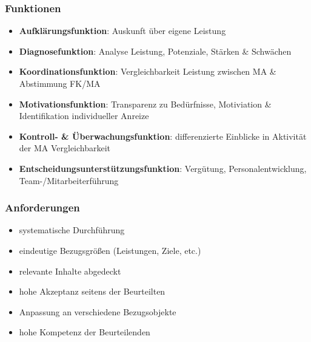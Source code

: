 \documentclass{cheatsheet}
\begin{document}
    \begin{normbox}{\subsubsection{Funktionen}}
        \begin{itemize}
            \item \textbf{Aufklärungsfunktion}: Auskunft über eigene Leistung
            \item \textbf{Diagnosefunktion}: Analyse Leistung, Potenziale, Stärken \& Schwächen
            \item \textbf{Koordinationsfunktion}: Vergleichbarkeit Leistung zwischen MA \& Abstimmung  FK/MA
            \item \textbf{Motivationsfunktion}: Transparenz zu Bedürfnisse, Motiviation \& Identifikation individueller Anreize
            \item \textbf{Kontroll- \& Überwachungsfunktion}: differenzierte Einblicke in Aktivität der MA \ra Vergleichbarkeit
            \item \textbf{Entscheidungsunterstützungsfunktion}: Vergütung, Personalentwicklung, Team-/Mitarbeiterführung
        \end{itemize}
    \end{normbox}
    \begin{normbox}{\subsubsection{Anforderungen}}
        \begin{itemize}
            \item systematische Durchführung
            \item eindeutige Bezugsgrößen (Leistungen, Ziele, etc.)
            \item relevante Inhalte abgedeckt
            \item hohe Akzeptanz seitens der Beurteilten
            \item Anpassung an verschiedene Bezugsobjekte
            \item hohe Kompetenz der Beurteilenden
        \end{itemize}
    \end{normbox}
\end{document}
